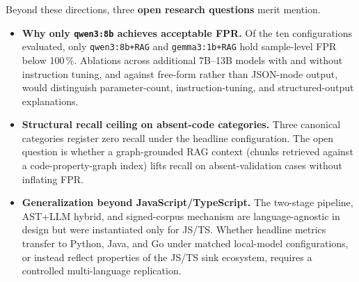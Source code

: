 Beyond these directions, three \textbf{open research questions} merit mention.
\begin{itemize}
  \item \textbf{Why only \texttt{qwen3:8b} achieves acceptable FPR.} Of the ten configurations evaluated, only \texttt{qwen3:8b+RAG} and \texttt{gemma3:1b+RAG} hold sample-level FPR below 100\,\%. Ablations across additional 7B--13B models with and without instruction tuning, and against free-form rather than JSON-mode output, would distinguish parameter-count, instruction-tuning, and structured-output explanations.
  \item \textbf{Structural recall ceiling on absent-code categories.} Three canonical categories register zero recall under the headline configuration. The open question is whether a graph-grounded RAG context (chunks retrieved against a code-property-graph index) lifts recall on absent-validation cases without inflating FPR.
  \item \textbf{Generalization beyond JavaScript/TypeScript.} The two-stage pipeline, AST+LLM hybrid, and signed-corpus mechanism are language-agnostic in design but were instantiated only for JS/TS. Whether headline metrics transfer to Python, Java, and Go under matched local-model configurations, or instead reflect properties of the JS/TS sink ecosystem, requires a controlled multi-language replication.
\end{itemize}
